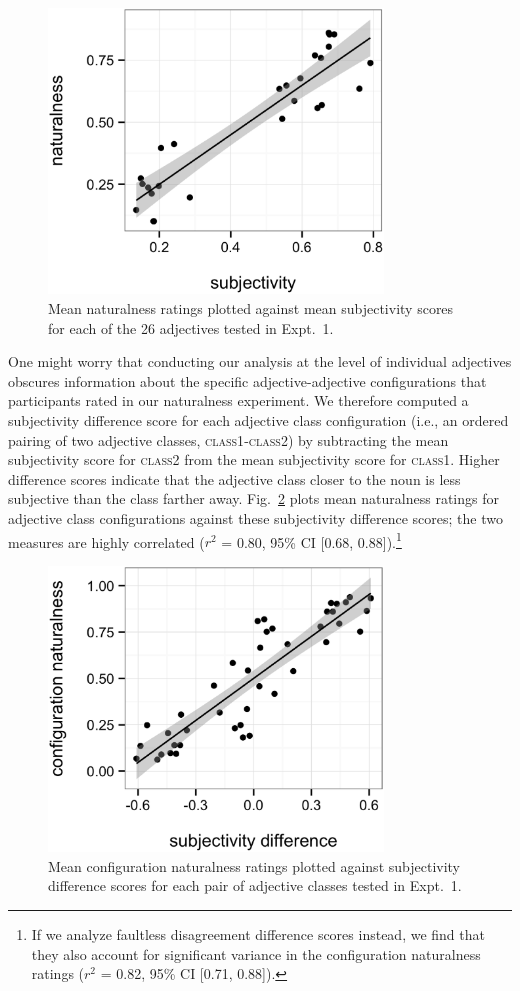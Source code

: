 \documentclass[12pt]{article}
\begin{document}
\begin{figure}
	\centering\includegraphics[width=3.5in]{plots/naturalness-subjectivity-new.eps}
	\caption{Mean naturalness ratings plotted against mean subjectivity scores for each of the 26 adjectives tested in Expt.~1.}\label{naturalness-subjectivity-pred}
\end{figure}

One might worry that conducting our analysis at the level of individual adjectives obscures information about the specific adjective-adjective configurations that participants rated in our naturalness experiment.
We therefore computed a subjectivity difference score for each adjective class configuration (i.e., an ordered pairing of two adjective classes, \textsc{class1}-\textsc{class2}) by subtracting the mean subjectivity score for \textsc{class2} from the mean subjectivity score for \textsc{class1}. Higher difference scores indicate that the adjective class closer to the noun is less subjective than the class farther away. Fig.~\ref{naturalness-subjectivity} plots mean naturalness ratings for adjective class configurations against these subjectivity difference scores; the two measures are highly correlated ($r^2$ = 0.80, 95\% CI [0.68, 0.88]).\footnote{If we analyze faultless disagreement difference scores instead, we find that they also account for significant variance in the configuration naturalness ratings ($r^2$ = 0.82, 95\% CI [0.71, 0.88]).}

\begin{figure}
	\centering\includegraphics[width=3.5in]{plots/naturalness-subjectivity-configuration.eps}
	\caption{Mean configuration naturalness ratings plotted against subjectivity difference scores for each pair of adjective classes tested in Expt.~1.}\label{naturalness-subjectivity}
\end{figure}
\end{document}
